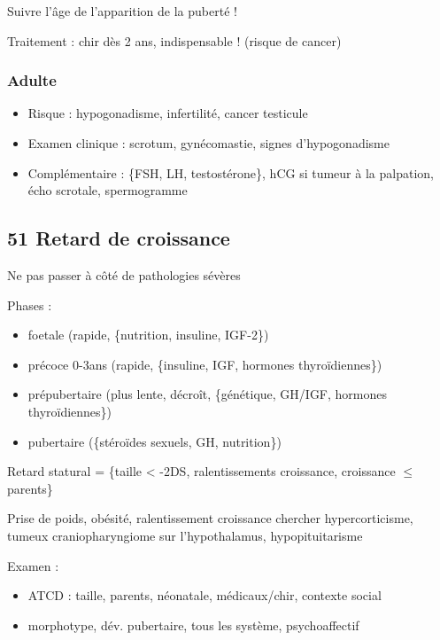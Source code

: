 \documentclass[11pt]{article}
\begin{document}
Suivre l'âge de l'apparition de la puberté !

Traitement : chir dès 2 ans, indispensable ! (risque de cancer)
\subsubsection{Adulte}
\label{sec:orgefdc659}
\begin{itemize}
\item Risque : hypogonadisme, infertilité, cancer testicule
\item Examen clinique : scrotum, gynécomastie, signes d'hypogonadisme
\item Complémentaire : \{FSH, LH, testostérone\}, hCG si tumeur à la palpation, écho
scrotale, spermogramme
\end{itemize}
\subsection{51 \textdagger{} Retard de croissance}
\label{sec:org67e6f06}
\danger Ne pas passer à côté de pathologies sévères

Phases : 
\begin{itemize}
\item foetale (rapide, \{nutrition, insuline, IGF-2\})
\item précoce 0-3ans (rapide, \{insuline, IGF, hormones thyroïdiennes\})
\item prépubertaire (plus lente, décroît, \{génétique, GH/IGF, hormones thyroïdiennes\})
\item pubertaire (\{stéroïdes sexuels, GH, nutrition\})
\end{itemize}

Retard statural = \{taille < -2DS, ralentissements croissance, croissance \(\le\) parents\}

Prise de poids, obésité, ralentissement croissance \thus chercher
hypercorticisme, tumeux craniopharyngiome sur l'hypothalamus, hypopituitarisme

Examen :
\begin{itemize}
\item ATCD : taille, parents, néonatale, médicaux/chir, contexte social
\item morphotype, dév. pubertaire, tous les système, psychoaffectif
\end{itemize}
\end{document}
